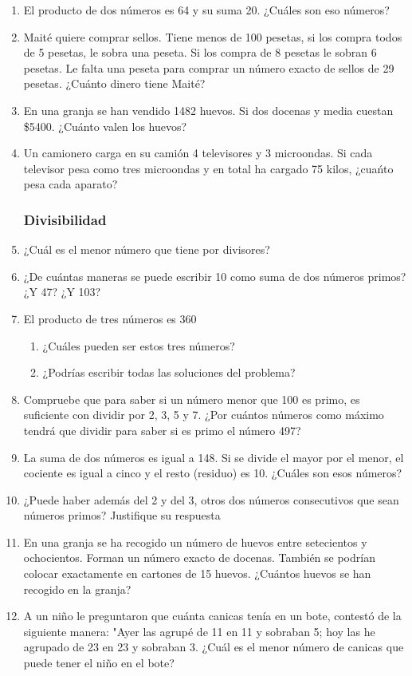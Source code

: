 \documentclass[letterpaper,11pt,twoside]{article}
\begin{document}
\begin{enumerate}
\item El producto de dos números es 64 y su suma 20. ¿Cuáles son eso números?
\item Maité quiere comprar sellos. Tiene menos de 100 pesetas, si los compra todos de 5 pesetas, le sobra una peseta. Si los compra de 8 pesetas le sobran 6 pesetas. Le falta una peseta para comprar un n\'{u}mero exacto de sellos de 29 pesetas. ¿Cu\'{a}nto dinero tiene Mait\'{e}?
\item En una granja se han vendido 1482 huevos. Si dos docenas y media cuestan \$5400. ¿Cuánto valen los huevos?
\item Un camionero carga en su camión 4 televisores y 3 microondas. Si cada televisor pesa como tres microondas y en total ha cargado 75 kilos, ¿cuańto pesa cada aparato?
\subsubsection*{Divisibilidad}
\item ¿Cuál es el menor número que tiene por divisores?
\begin{enumerate}
\end{enumerate}
\item ¿De cuántas maneras se puede escribir 10 como suma de dos números primos? ¿Y 47? ¿Y 103?
\item El producto de tres números es 360
\begin{enumerate}
\item ¿Cuáles pueden ser estos tres números?
\item ¿Podrías escribir todas las soluciones del problema?
\end{enumerate}
\item Compruebe que para saber si un número menor que 100 es primo, es suficiente con dividir por 2, 3, 5 y 7. ¿Por cuántos números como máximo tendrá que dividir para saber si es primo el número 497?
\item La suma de dos números es igual a 148. Si se divide el mayor por el menor, el cociente es igual a cinco y el resto (residuo) es 10. ¿Cuáles son esos números?
\item ¿Puede haber además del 2 y del 3, otros dos números consecutivos que sean números primos? Justifique su respuesta
\item En una granja se ha recogido un número de huevos entre setecientos y ochocientos. Forman un número exacto de docenas. También se podrían colocar exactamente en cartones de 15 huevos. ¿Cuántos huevos se han recogido en la granja?
\item A un niño le preguntaron que cuánta canicas tenía en un bote, contestó de la siguiente manera: "Ayer las agrupé de 11 en 11 y sobraban 5; hoy las he agrupado de 23 en 23 y sobraban 3. ¿Cuál es el menor número de canicas que puede tener el niño en el bote?


\end{enumerate}
\end{document}
